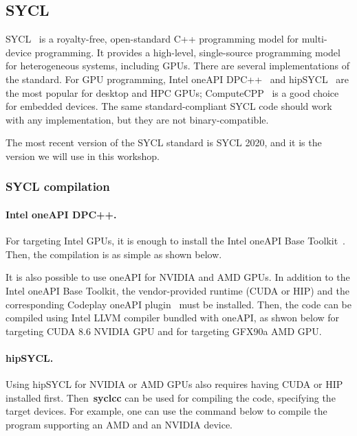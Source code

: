 

\subsection{SYCL}


\par
SYCL~\cite{sycl} is a royalty-free, open-standard C++ programming model for multi-device programming.
It provides a high-level, single-source programming model for heterogeneous systems, including GPUs.
There are several implementations of the standard.
For GPU programming, Intel oneAPI DPC++~\cite{oneapi-dpc} and hipSYCL~\cite{hipsycl} are the most popular for desktop and HPC GPUs; ComputeCPP~\cite{computecpp} is a good choice for embedded devices.
The same standard-compliant SYCL code should work with any implementation, but they are not binary-compatible.


\par
The most recent version of the SYCL standard is SYCL 2020, and it is the version we will use in this workshop.


\subsubsection{SYCL compilation}


\paragraph{Intel oneAPI DPC++.}
For targeting Intel GPUs, it is enough to install the Intel oneAPI Base Toolkit~\cite{intel_oneapi_base_toolkit}. 
Then, the compilation is as simple as shown below.

It is also possible to use oneAPI for NVIDIA and AMD GPUs.
In addition to the Intel oneAPI Base Toolkit, the vendor-provided runtime (CUDA or HIP) and the corresponding Codeplay oneAPI plugin~\cite{codeplay-oneapi} must be installed.
Then, the code can be compiled using Intel LLVM compiler bundled with oneAPI, as shwon below for targeting CUDA 8.6 NVIDIA GPU and for targeting GFX90a AMD GPU.



\paragraph{hipSYCL.}
Using hipSYCL for NVIDIA or AMD GPUs also requires having CUDA or HIP installed first.
Then~\textbf{syclcc} can be used for compiling the code, specifying the target devices.
For example, one can use the command below to compile the program supporting an AMD and an NVIDIA device.



